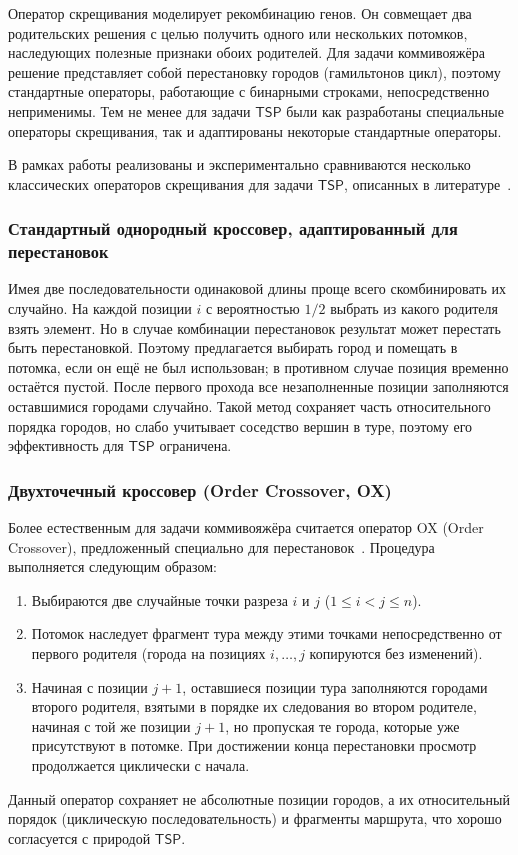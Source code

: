 \documentclass[a4paper,12pt]{article}
\begin{document}
Оператор скрещивания моделирует рекомбинацию генов. Он совмещает два родительских решения с целью получить одного или нескольких потомков, наследующих полезные
признаки обоих родителей. Для задачи коммивояжёра решение представляет собой перестановку
городов (гамильтонов цикл), поэтому стандартные операторы, работающие с бинарными строками, непосредственно неприменимы. Тем не менее для задачи $\mathsf{TSP}$ были как разработаны специальные операторы скрещивания, так и адаптированы некоторые стандартные операторы.

В рамках работы реализованы и экспериментально сравниваются несколько классических операторов
скрещивания для задачи $\mathsf{TSP}$, описанных в литературе~\cite{gendreau2010handbook, taillard2023design}.

\subsubsection{Стандартный однородный кроссовер, адаптированный для перестановок}

Имея две последовательности одинаковой длины проще всего скомбинировать их случайно. На каждой позиции $i$ с вероятностью $1/2$ выбрать из какого родителя взять элемент. Но в случае комбинации перестановок результат может перестать быть перестановкой. 
Поэтому предлагается выбирать город и помещать в потомка, если он ещё не был использован;
в противном случае позиция временно остаётся пустой. После первого прохода все незаполненные
позиции заполняются оставшимися городами случайно. Такой метод сохраняет часть относительного порядка городов, но слабо учитывает
соседство вершин в туре, поэтому его эффективность для $\mathsf{TSP}$ ограничена.

\subsubsection{Двухточечный кроссовер (Order Crossover, OX)}

Более естественным для задачи коммивояжёра считается оператор OX (Order Crossover),
предложенный специально для перестановок~\cite{taillard2023design}. Процедура выполняется
следующим образом:
\begin{enumerate}
  \item Выбираются две случайные точки разреза $i$ и $j$ ($1 \le i < j \le n$).
  \item Потомок наследует фрагмент тура между этими точками непосредственно от первого
        родителя (города на позициях $i,\dots,j$ копируются без изменений).
  \item Начиная с позиции $j+1$, оставшиеся позиции тура заполняются городами второго
        родителя, взятыми в порядке их следования во втором родителе, начиная с той же
        позиции $j+1$, но пропуская те города, которые уже присутствуют в потомке.
        При достижении конца перестановки просмотр продолжается циклически с начала.
\end{enumerate}
Данный оператор сохраняет не абсолютные позиции городов, а их относительный порядок
(циклическую последовательность) и фрагменты маршрута, что хорошо согласуется с природой
$\mathsf{TSP}$.
\end{document}
